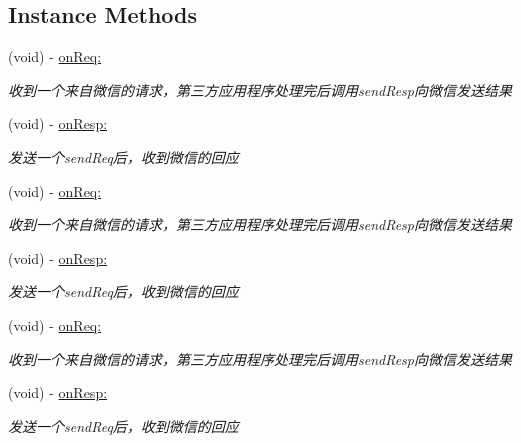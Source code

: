 \subsection*{Instance Methods}
\begin{DoxyCompactItemize}
\item 
(void) -\/ \mbox{\hyperlink{protocol_w_x_api_delegate_01-p_a185c8b9b51ff2398667dbf8cedffc8d6}{on\+Req\+:}}
\begin{DoxyCompactList}\small\item\em 收到一个来自微信的请求，第三方应用程序处理完后调用send\+Resp向微信发送结果 \end{DoxyCompactList}\item 
(void) -\/ \mbox{\hyperlink{protocol_w_x_api_delegate_01-p_a241d3c0bbfa2c223235df0f1b118b687}{on\+Resp\+:}}
\begin{DoxyCompactList}\small\item\em 发送一个send\+Req后，收到微信的回应 \end{DoxyCompactList}\item 
(void) -\/ \mbox{\hyperlink{protocol_w_x_api_delegate_01-p_a185c8b9b51ff2398667dbf8cedffc8d6}{on\+Req\+:}}
\begin{DoxyCompactList}\small\item\em 收到一个来自微信的请求，第三方应用程序处理完后调用send\+Resp向微信发送结果 \end{DoxyCompactList}\item 
(void) -\/ \mbox{\hyperlink{protocol_w_x_api_delegate_01-p_a241d3c0bbfa2c223235df0f1b118b687}{on\+Resp\+:}}
\begin{DoxyCompactList}\small\item\em 发送一个send\+Req后，收到微信的回应 \end{DoxyCompactList}\item 
(void) -\/ \mbox{\hyperlink{protocol_w_x_api_delegate_01-p_a185c8b9b51ff2398667dbf8cedffc8d6}{on\+Req\+:}}
\begin{DoxyCompactList}\small\item\em 收到一个来自微信的请求，第三方应用程序处理完后调用send\+Resp向微信发送结果 \end{DoxyCompactList}\item 
(void) -\/ \mbox{\hyperlink{protocol_w_x_api_delegate_01-p_a241d3c0bbfa2c223235df0f1b118b687}{on\+Resp\+:}}
\begin{DoxyCompactList}\small\item\em 发送一个send\+Req后，收到微信的回应 \end{DoxyCompactList}\end{DoxyCompactItemize}



